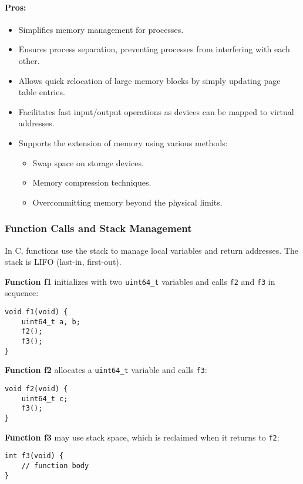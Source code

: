 \documentclass[12pt]{article}
\begin{document}
\paragraph{Pros:}
\begin{itemize}
    \item Simplifies memory management for processes.
    \item Ensures process separation, preventing processes from interfering with each other.
    \item Allows quick relocation of large memory blocks by simply updating page table entries.
    \item Facilitates fast input/output operations as devices can be mapped to virtual addresses.
    \item Supports the extension of memory using various methods:
    \begin{itemize}
        \item Swap space on storage devices.
        \item Memory compression techniques.
        \item Overcommitting memory beyond the physical limits.
    \end{itemize}
\end{itemize}


\subsubsection{Function Calls and Stack Management}

In C, functions use the stack to manage local variables and return addresses. The stack is LIFO (last-in, first-out). 

\textbf{Function f1} initializes with two \texttt{uint64\_t} variables and calls \texttt{f2} and \texttt{f3} in sequence:
\begin{verbatim}
void f1(void) {
    uint64_t a, b;
    f2();
    f3();
}
\end{verbatim}

\textbf{Function f2} allocates a \texttt{uint64\_t} variable and calls \texttt{f3}:
\begin{verbatim}
void f2(void) {
    uint64_t c;
    f3();
}
\end{verbatim}

\textbf{Function f3} may use stack space, which is reclaimed when it returns to \texttt{f2}:
\begin{verbatim}
int f3(void) {
    // function body
}
\end{verbatim}
\end{document}
